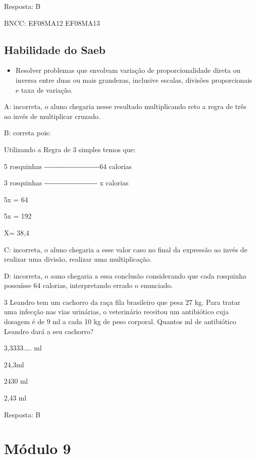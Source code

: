 Resposta: B

BNCC: EF08MA12 EF08MA13

\section{Habilidade do Saeb}

\begin{itemize}
\tightlist

\item 
  Resolver problemas que envolvam variação de proporcionalidade direta
  ou inversa entre duas ou mais grandezas, inclusive escalas, divisões
  proporcionais e taxa de variação.
\end{itemize}

A: incorreta, o aluno chegaria nesse resultado multiplicando reto a
regra de três ao invés de multiplicar cruzado.

B: correta pois:

Utilizando a Regra de 3 simples temos que:

5 rosquinhas
-\/-\/-\/-\/-\/-\/-\/-\/-\/-\/-\/-\/-\/-\/-\/-\/-\/-\/-\/-\/-\/-\/-\/-64
calorias

3 rosquinhas
-\/-\/-\/-\/-\/-\/-\/-\/-\/-\/-\/-\/-\/-\/-\/-\/-\/-\/-\/-\/-\/-\/- x
calorias

5x = 64

5x = 192

X= 38,4

C: incorreta, o aluno chegaria a esse valor caso no final da expressão
ao invés de realizar uma divisão, realizar uma multiplicação.

D: incorreta, o auno chegaria a essa conclusão considerando que cada
rosquinha possuísse 64 calorias, interpretando errado o enunciado.

\num{3} Leandro tem um cachorro da raça fila brasileiro que pesa 27 kg. Para
tratar uma infecção nas vias urinárias, o veterinário receitou um
antibiótico cuja dosagem é de 9 ml a cada 10 kg de peso corporal.
Quantos ml de antibiótico Leandro dará a seu cachorro?

\item 3,3333.\ldots. ml
\item 24,3ml
\item 2430 ml
\item 2,43 ml

Resposta: B

\chapter{Módulo 9}


